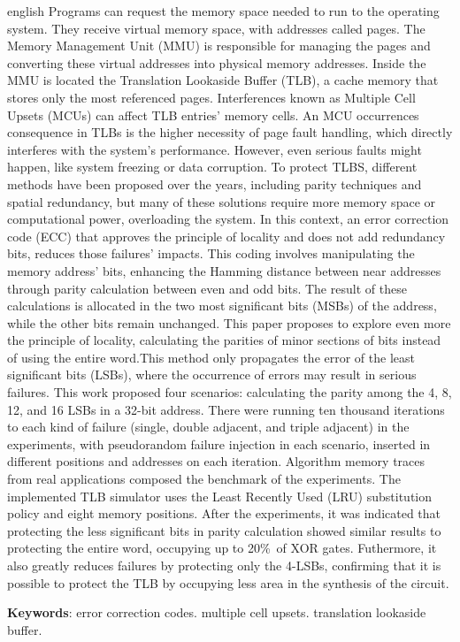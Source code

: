 \begin{resumo}[Abstract]
 \begin{otherlanguage*}{english}
   Programs can request the memory space needed to run to the operating system.
   They receive virtual memory space, with addresses called pages. The Memory Management Unit (MMU) is responsible for managing the pages and converting these virtual addresses into physical memory addresses. Inside the MMU is located the Translation Lookaside Buffer (TLB), a cache memory that stores only the most referenced pages. Interferences known as Multiple Cell Upsets (MCUs) can affect TLB entries’ memory cells. An MCU occurrences consequence in TLBs is the higher necessity of page fault handling, which directly interferes with the system’s performance. However, even serious faults might happen, like system freezing or data corruption. To protect TLBS, different methods have been proposed over the years, including parity techniques and spatial redundancy, but many of these solutions require more memory space or computational power, overloading the system. In this context, an error correction code (ECC) that approves the principle of locality and does not add redundancy bits, reduces those failures’ impacts. This coding involves manipulating the memory address’ bits, enhancing the Hamming distance between near addresses through parity calculation between even and odd bits. The result of these calculations is allocated in the two most significant bits (MSBs) of the address, while the other bits remain unchanged. This paper proposes to explore even more the principle of locality, calculating the parities of minor sections of bits instead of using the entire word.This method only propagates the error of the least significant bits (LSBs), where the occurrence of errors may result in serious failures. This work proposed four scenarios: calculating the parity among the 4, 8, 12, and 16 LSBs in a 32-bit address. There were running ten thousand iterations to each kind of failure (single, double adjacent, and triple adjacent) in the experiments, with pseudorandom failure injection in each scenario, inserted in different positions and addresses on each iteration. Algorithm memory traces from real applications composed the benchmark of the experiments. The implemented TLB simulator uses the Least Recently Used (LRU) substitution policy and eight memory positions. After the experiments, it was indicated that protecting the less significant bits in parity calculation showed similar results to protecting the entire word, occupying up to 20\%\ of XOR gates. Futhermore, it also greatly reduces failures by protecting only the 4-LSBs, confirming that it is possible to protect the TLB by occupying less area in the synthesis of the circuit.
   \vspace{\onelineskip}
 
   \noindent 
   \textbf{Keywords}: error correction codes. multiple cell upsets. translation lookaside buffer.
 \end{otherlanguage*}
\end{resumo}